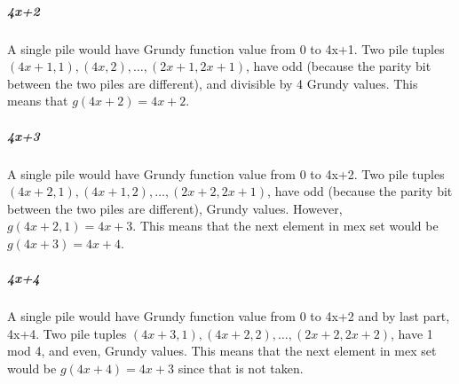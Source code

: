 \documentclass[addpoints,answers]{exam}
\begin{document}
\begin{questions}
\begin{solutionorbox}[\stretch{1}]
								\subparagraph{4x+2}A single pile would have Grundy function
								value from 0 to 4x+1. Two pile tuples $(4x+1, 1),
								(4x,2),\dots,(2x+1, 2x+1)$, have odd (because the parity bit
								between the two piles are different), and divisible by 4 Grundy 
								values. This means that $g(4x+2) = 4x+2$.

								\subparagraph{4x+3}A single pile would have Grundy function
								value from 0 to 4x+2. Two pile tuples $(4x+2, 1),
								(4x+1,2),\dots,(2x+2, 2x+1)$, have odd (because the parity bit
								between the two piles are different), Grundy values. However,
								$g(4x+2,1)=4x+3$. This means that the next element in mex set
								would be $g(4x+3) = 4x+4$.

								\subparagraph{4x+4}A single pile would have Grundy function
								value from 0 to 4x+2 and by last part, 4x+4. 
								Two pile tuples $(4x+3, 1),
								(4x+2,2),\dots,(2x+2, 2x+2)$, have 1 mod 4, and even, Grundy
								values. This means that the next element in mex set
								would be $g(4x+4) = 4x+3$ since that is not taken.

            \end{solutionorbox}
            \newpage
 
\end{questions}
\end{document}
